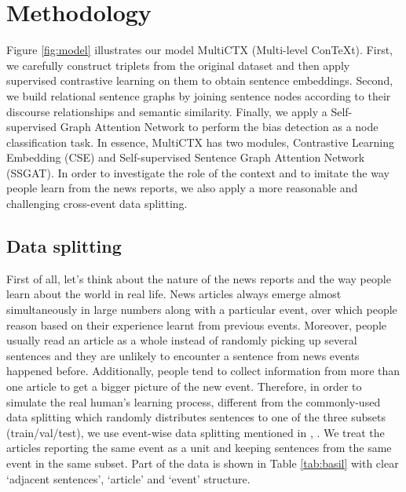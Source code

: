 \section{Methodology}

Figure \ref{fig:model} illustrates our model MultiCTX (Multi-level ConTeXt). First, we carefully construct triplets from the original dataset and then apply supervised contrastive learning on them to obtain sentence embeddings. Second, we build relational sentence graphs by joining sentence nodes according to their discourse relationships and semantic similarity. Finally, we apply a Self-supervised Graph Attention Network \citep{kim2021how} to perform the bias detection as a node classification task. In essence, MultiCTX has two modules, Contrastive Learning Embedding (CSE) and Self-supervised Sentence Graph Attention Network (SSGAT). In order to investigate the role of the context and to imitate the way people learn from the news reports, we also apply a more reasonable and challenging cross-event data splitting. 

\subsection{Data splitting}

First of all, let's think about the nature of the news reports and the way people learn about the world in real life. News articles always emerge almost simultaneously in large numbers along with a particular event, over which people reason based on their experience learnt from previous events. Moreover, people usually read an article as a whole instead of randomly picking up several sentences and they are unlikely to encounter a sentence from news events happened before. Additionally, people tend to collect information from more than one article to get a bigger picture of the new event. Therefore, in order to simulate the real human's learning process, different from the commonly-used data splitting which randomly distributes sentences to one of the three subsets (train/val/test), we use event-wise data splitting mentioned in \citet{van-den-berg-markert-2020-context}, \citet{chen-etal-2020-detecting}. We treat the articles reporting the same event as a unit and keeping sentences from the same event in the same subset. Part of the data is shown in Table \ref{tab:basil} with clear `adjacent sentences', `article' and `event' structure.

